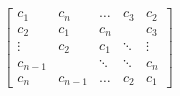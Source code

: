 \documentclass[10pt]{article}
\begin{document}
\begin{align*}\begin{bmatrix}
    c_1 & c_n & \dots & c_3 & c_2 \\
    c_2 & c_1 & c_n  & & c_3 \\
    \vdots &  c_2 & c_1 &\ddots  & \vdots \\
    c_{n-1} & & \ddots & \ddots & c_n \\
    c_n & c_{n-1} & \dots & c_2 & c_1
\end{bmatrix}\end{align*}
\end{document}

